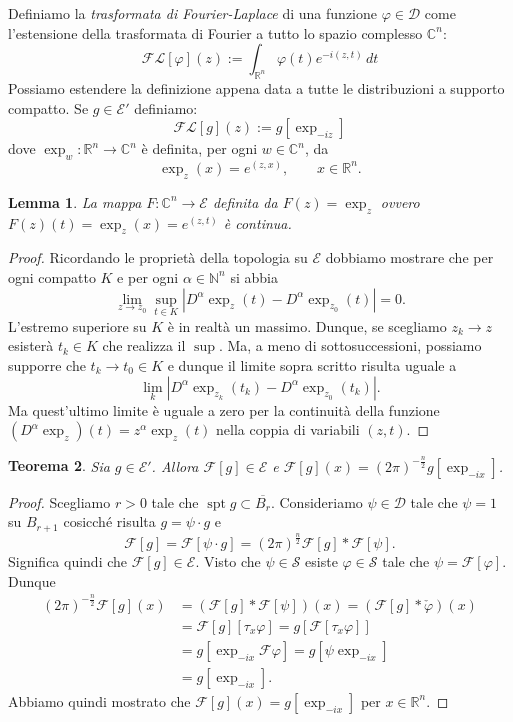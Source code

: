 \documentclass[italian,a4paper,oneside,headinclude]{scrbook}
\renewcommand{\phi}{\varphi}
\newcommand{\D}{\mathcal D}
\newcommand{\E}{\mathcal E}
\newcommand{\F}{\mathcal F}
\newcommand{\FL}{\mathcal F\!\mathcal L}
\renewcommand{\S}{\mathcal S}
\newcommand{\CC}{\mathbb C}
\newcommand{\NN}{\mathbb N}
\newcommand{\RR}{\mathbb R}
\newcommand{\abs}[1]{{\left|#1\right|}}
\newcommand{\defeq}{:=}
\DeclareMathOperator{\spt}{spt}
\newtheorem{theorem}{Teorema}
\newtheorem{lemma}[theorem]{Lemma}
\begin{document}
Definiamo la \emph{trasformata di Fourier-Laplace}
\marginpar{$\FL[\phi]$}
di una funzione
$\phi\in \D$ come
l'estensione della trasformata di Fourier a tutto lo spazio complesso
$\CC^n$:
\begin{equation}\label{eq:Cfourier}
  \FL[\phi](z) \defeq \int_{\RR^n} \phi(t) e^{-i(z,t)}\, dt
\end{equation}
Possiamo estendere la definizione appena data a tutte le distribuzioni
a supporto compatto.
Se $g\in \E'$ definiamo:
\marginpar{$\FL[g]$}
\begin{equation}\label{eq:Cfourier_dist}
\FL[g](z) \defeq g[\exp_{-iz}]
\end{equation}
dove $\exp_w\colon \RR^n \to \CC^n$ è definita, per ogni $w\in \CC^n$, da
\[
\exp_z(x) = e^{(z,x)},\qquad x\in \RR^n.
\]

\begin{lemma}
  La mappa $F\colon \CC^n \to \E$ definita da $F(z) = \exp_z$ ovvero $F(z)(t) = \exp_z(x) = e^{(z,t)}$ è continua.
\end{lemma}
\begin{proof}
  Ricordando le proprietà della topologia su $\E$
  dobbiamo mostrare che per ogni
  compatto $K$ e per ogni $\alpha \in \NN^n$ si abbia
  \[
  \lim_{z\to z_0} \sup_{t\in K} \abs{D^\alpha\exp_z(t) -
    D^\alpha\exp_{z_0}(t)} = 0.
  \]
  L'estremo superiore su $K$ è in realtà un massimo. Dunque, se
  scegliamo $z_k \to z$
  esisterà
  $t_k\in K$ che realizza il $\sup$. Ma, a meno di sottosuccessioni,
  possiamo supporre che $t_k \to t_0\in K$ e dunque il limite sopra
  scritto risulta uguale a
  \[
  \lim_k \abs{D^\alpha \exp_{z_k}(t_k)- D^\alpha \exp_{z_0}(t_k)}.
  \]
  Ma quest'ultimo limite è uguale a zero per la continuità della
  funzione $(D^\alpha \exp_z)(t) = z^\alpha \exp_z(t)$
  nella coppia di variabili $(z,t)$.
\end{proof}


\begin{theorem}\label{th:def_FL}
  Sia $g\in \E'$.
  Allora $\F[g] \in \E$ e $\F[g](x) = (2\pi)^{-\frac n 2} g[\exp_{-ix}]$.
\end{theorem}
\begin{proof}
  Scegliamo $r>0$ tale che $\spt g \subset \overline{B_r}$.
  Consideriamo $\psi\in \D$ tale che $\psi = 1$ su $B_{r+1}$ cosicché
  risulta $g=\psi \cdot g$ e
  \[
  \F[g] = \F[\psi\cdot g] = (2\pi)^{\frac n 2}\F[g] * \F[\psi].
  \]
  Significa quindi che $\F[g]\in \E$. Visto che $\psi\in \S$ esiste
  $\phi\in \S$ tale che $\psi = \F[\phi]$. Dunque
  \begin{align*}
    (2\pi)^{-\frac n 2} \F[g](x) &=
    (\F[g] * \F[\psi])(x)
    = (\F[g] * \check \phi)(x) \\
    &= \F[g][\tau_x \phi]
    = g[\F[\tau_x \phi]] \\
    &= g[\exp_{-ix}\F\phi]
    = g[\psi \exp_{-ix}] \\
    &= g[\exp_{-ix}].
  \end{align*}
  Abbiamo quindi mostrato che $\F[g](x) = g[\exp_{-ix}]$ per
  $x\in \RR^n$.
\end{proof}
\end{document}
